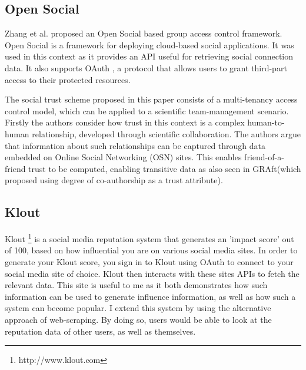 \subsection{Open Social}

Zhang et al. \cite{} proposed an Open Social based group access control framework. Open Social is a framework for deploying cloud-based social applications. It was used in this context as it provides an API useful for retrieving social connection data. It also supports OAuth \cite{}, a protocol that allows users to grant third-part access to their protected resources.

The social trust scheme proposed in this paper consists of a multi-tenancy access control model, which can be applied to a scientific team-management scenario. Firstly the authors consider how trust in this context is a complex human-to-human relationship, developed through scientific collaboration. The authors argue that information about such relationships can be captured through data embedded on Online Social Networking (OSN) sites. This enables friend-of-a-friend trust to be computed, enabling transitive data as also seen in GRAft(which proposed using degree of co-authorship as a trust attribute).


\subsection{Klout}

Klout \footnote{http://www.klout.com} is a social media reputation system that generates an 'impact score' out of 100, based on how influential you are on various social media sites. In order to generate your Klout score, you sign in to Klout using OAuth to connect to your social media site of choice. Klout then interacts with these sites APIs to fetch the relevant data. This site is useful to me as it both demonstrates how such information can be used to generate influence information, as well as how such a system can become popular. I extend this system by using the alternative approach of web-scraping. By doing so, users would be able to look at the reputation data of other users, as well as themselves. 

